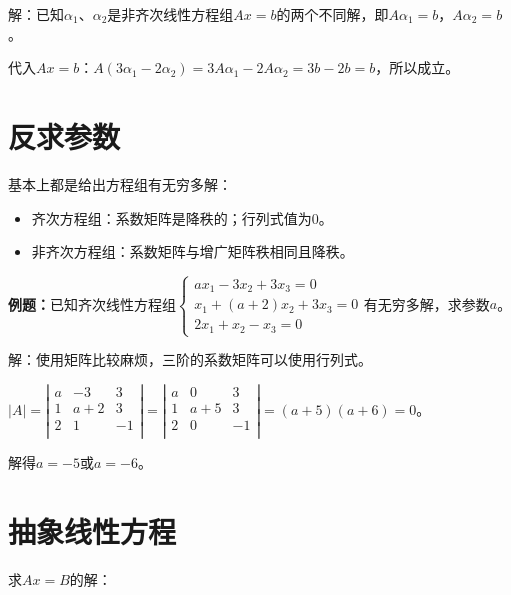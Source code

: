 \documentclass[UTF8, 12pt]{ctexart}
\begin{document}
解：已知$\alpha_1$、$\alpha_2$是非齐次线性方程组$Ax=b$的两个不同解，即$A\alpha_1=b$，$A\alpha_2=b$。

代入$Ax=b$：$A(3\alpha_1-2\alpha_2)=3A\alpha_1-2A\alpha_2=3b-2b=b$，所以成立。


\section{反求参数}

基本上都是给出方程组有无穷多解：

\begin{itemize}
    \item 齐次方程组：系数矩阵是降秩的；行列式值为0。
    \item 非齐次方程组：系数矩阵与增广矩阵秩相同且降秩。
\end{itemize}

\textbf{例题：}已知齐次线性方程组$\left\{\begin{array}{l}
    ax_1-3x_2+3x_3=0 \\
    x_1+(a+2)x_2+3x_3=0 \\
    2x_1+x_2-x_3=0
\end{array}\right.$有无穷多解，求参数$a$。

解：使用矩阵比较麻烦，三阶的系数矩阵可以使用行列式。

$\vert A\vert=\left\vert\begin{array}{ccc}
    a & -3 & 3 \\
    1 & a+2 & 3 \\
    2 & 1 & -1 \\
\end{array}\right\vert=\left\vert\begin{array}{ccc}
    a & 0 & 3 \\
    1 & a+5 & 3 \\
    2 & 0 & -1 \\
\end{array}\right\vert=(a+5)(a+6)=0$。

解得$a=-5$或$a=-6$。

\section{抽象线性方程}

求$Ax=B$的解：
\end{document}
